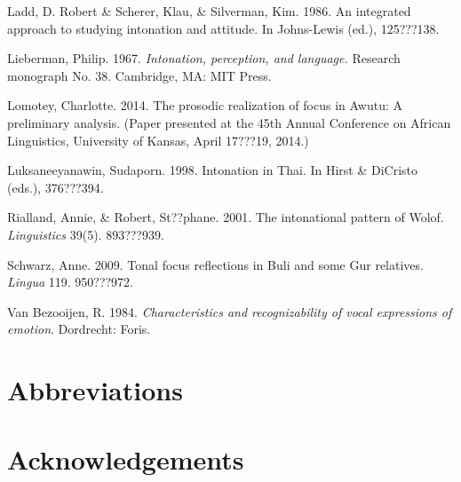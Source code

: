 \documentclass[output=paper]{langsci/langscibook}
\begin{document}
\begin{styleReferences}
Ladd, D. Robert \& Scherer, Klau, \& Silverman, Kim. 1986. An integrated approach to studying intonation and attitude. In Johns-Lewis (ed.),  125???138.
\end{styleReferences}

\begin{styleReferences}
Lieberman, Philip. 1967. \textit{Intonation, perception, and language. }Research monograph No. 38.\textit{ } Cambridge, MA: MIT Press.
\end{styleReferences}

\begin{styleReferences}
Lomotey, Charlotte.  2014. The prosodic realization of focus in Awutu: A preliminary analysis. (Paper presented at the 45th Annual Conference on African Linguistics, University of Kansas, April 17???19, 2014.)
\end{styleReferences}

\begin{styleReferences}
Luksaneeyanawin, Sudaporn. 1998. Intonation in Thai. In Hirst \& DiCristo (eds.), 376???394.
\end{styleReferences}

\begin{styleReferences}
Rialland, Annie, \& Robert, St??phane. 2001. The intonational pattern of Wolof. \textit{Linguistics} 39(5). 893???939.
\end{styleReferences}

\begin{styleReferences}
Schwarz, Anne. 2009. Tonal focus reflections in Buli and some Gur relatives. \emph{Lingua} 119. 950???972.
\end{styleReferences}

\begin{styleBibliographyiv}
Van Bezooijen, R. 1984. \emph{Characteristics and recognizability of vocal expressions of emotion}. Dordrecht: Foris.
\end{styleBibliographyiv}



\section*{Abbreviations}
\section*{Acknowledgements}

{\sloppy
\printbibliography[heading=subbibliography,notkeyword=this]
}
\end{document}
